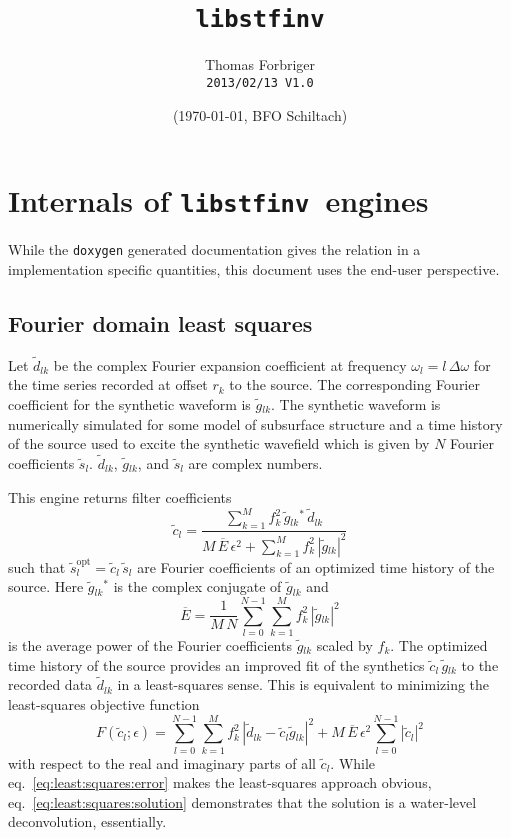 \documentclass{article}
\newcommand{\version}{2013/02/13 V1.0}
\newcommand{\libstfinv}{\texttt{libstfinv}}
\newcommand{\Fourier}[1]{\ensuremath{\tilde{#1}}}
\newcommand{\Fd}{\ensuremath{\Fourier{d}}}
\newcommand{\Fs}{\ensuremath{\Fourier{g}}}
\newcommand{\Sg}{\ensuremath{s}}
\newcommand{\Fq}{\ensuremath{\Fourier{c}}}
\newcommand{\Fg}{\ensuremath{\Fourier{\Sg}}}
\newcommand{\FQl}{\ensuremath{\Fourier{\Sg}_{l}^{\text{opt}}}}
\newcommand{\So}{\ensuremath{\omega}}
\newcommand{\Sf}{\ensuremath{f}}
\newcommand{\Sr}{\ensuremath{r}}
\newcommand{\Ssk}{\ensuremath{\sum\limits_{k=1}^{M}}}
\newcommand{\SslN}{\ensuremath{\sum\limits_{l=0}^{N-1}}}
\newcommand{\Silk}{\ensuremath{_{lk}}}
\newcommand{\Scc}{\ensuremath{^{\ast}}}
\newcommand{\SmE}{\ensuremath{\overline{E}}}
\newcommand{\Se}{\ensuremath{\epsilon}}
\begin{document}
\title{\libstfinv}
\author{Thomas Forbriger\\ \texttt{\version}}
\date{(\today, BFO Schiltach)}
\maketitle
\section{Internals of \libstfinv\ engines}
While the \texttt{doxygen} generated documentation gives the relation in a
implementation specific quantities, this document uses the end-user
perspective.

\subsection{Fourier domain least squares}
Let $\Fd_{lk}$ be the complex Fourier expansion coefficient at frequency
$\So_l=l\,\Delta\So$ for the time series recorded at offset $\Sr_k$ to the
source. 
The corresponding Fourier coefficient for the synthetic waveform is
$\Fs\Silk$.
The synthetic waveform is numerically simulated for
some model of subsurface structure and a time history of the source
used to excite the synthetic wavefield which is given by
$N$ Fourier coefficients $\Fg_l$.
$\Fd\Silk$, $\Fs\Silk$, and $\Fg_l$ are complex numbers.

This engine returns filter coefficients 
\begin{equation}
\Fq_l=\frac{\Ssk\Sf^2_k\,\Fs\Silk\Scc\,\Fd\Silk}{M\,\SmE\,\Se^2+
\Ssk\Sf^2_k\,\left|\Fs\Silk\right|^2}
\label{eq:least:squares:solution}
\end{equation}
such that $\FQl=\Fq_l\,\Fg_l$
are Fourier coefficients of an optimized time history of the source.
Here $\Fs\Silk\Scc$ is the complex conjugate of $\Fs\Silk$
and
\begin{equation}
\SmE=\frac{1}{M\,N}\SslN\Ssk\Sf^2_k\,\left|\Fs\Silk\right|^2
\end{equation}
is the average power of the Fourier coefficients $\Fs\Silk$ scaled by
$\Sf_k$.
The optimized time history of the source provides an improved fit of the
synthetics $\Fq_l\,\Fs\Silk$ to the recorded data $\Fd\Silk$ in a
least-squares sense.
This is equivalent to minimizing the least-squares objective function
\begin{equation}
F(\Fq_l;\Se)=\SslN\Ssk\Sf^2_k\,\left|\Fd\Silk-\Fq_l\Fs\Silk\right|^2
+M\,\SmE\,\Se^2\SslN\left|\Fq_l\right|^2
\label{eq:least:squares:error}
\end{equation}
with respect to the real and imaginary parts of all $\Fq_l$.
While eq.~\eqref{eq:least:squares:error} makes the least-squares approach
obvious, eq.~\eqref{eq:least:squares:solution} demonstrates that the solution
is a water-level deconvolution, essentially.
\end{document}
